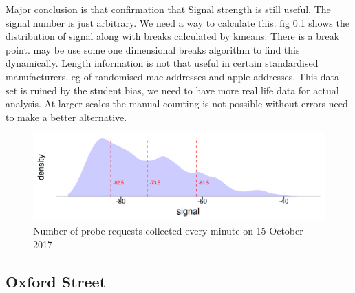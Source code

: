 Major conclusion is that confirmation that Signal strength is still useful.
The signal number is just arbitrary. We need a way to calculate this.
fig \ref{} shows the distribution of signal along with breaks calculated by kmeans.
There is a break point. may be use some one dimensional breaks algorithm to find this dynamically.
Length information is not that useful in certain standardised manufacturers.
eg of randomised mac addresses and apple addresses.
This data set is ruined by the student bias, we need to have more real life data for actual analysis.
At larger scales the manual counting is not possible without errors need to make a better alternative.

\begin{figure}
\includegraphics[trim={5 5 5 5},clip]{images/ucl-signal-dist.png}
  \caption{Number of probe requests collected every minute on 15 October 2017}
  \label{figure:collection:ucl:signal}
\end{figure}
\marginnote{\textit{} }

\lipsum[1]

\subsection{Oxford Street}

